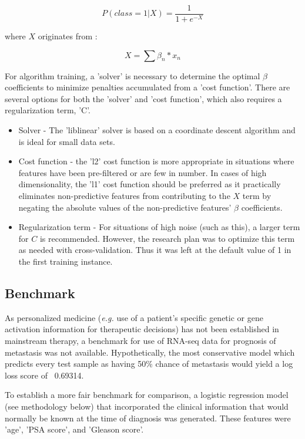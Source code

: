 \documentclass[final]{article}
\begin{document}
$$ P(class = 1 | X) = \frac{1}{1+e^{-X}}$$

where $X$ originates from :

$$ X = \sum{ \beta_{n}*x_{n}} $$

For algorithm training, a 'solver' is necessary to determine the optimal $\beta$
coefficients to minimize penalties accumulated from a 'cost function'.  There are
several options for both the 'solver' and 'cost function', which also requires
a regularization term, 'C'.

\begin{itemize}
  \item Solver - The 'liblinear' solver is based on a coordinate descent algorithm and
  is ideal for small data sets.
  \item Cost function - the 'l2' cost function is more appropriate in situations
  where features have been pre-filtered or are few in number.  In cases of high
  dimensionality, the 'l1' cost function should be preferred as it practically eliminates
  non-predictive features from contributing to the $X$ term by negating the absolute
  values of the non-predictive features' $\beta$ coefficients.
  \item Regularization term - For situations of high noise (such as this), a larger term
  for $C$ is recommended.  However, the research plan was to optimize this term as needed with
  cross-validation.  Thus it was left at the default value of 1 in the first training instance.
\end{itemize}


\subsection{Benchmark}

As personalized medicine (\textit{e.g.} use of a patient's specific genetic or gene
activation information for therapeutic decisions) has not been established in
mainstream therapy, a benchmark for use of RNA-seq data for prognosis of
metastasis was not available.  Hypothetically, the most conservative model which
predicts every test sample as having 50\% chance of metastasis would yield a log
loss score of ~0.69314.

To establish a more fair benchmark for comparison, a logistic regression model
(see methodology below) that incorporated the clinical information that would
normally be known at the time of diagnosis was generated.  These features were
'age', 'PSA score', and 'Gleason score'.
\end{document}
